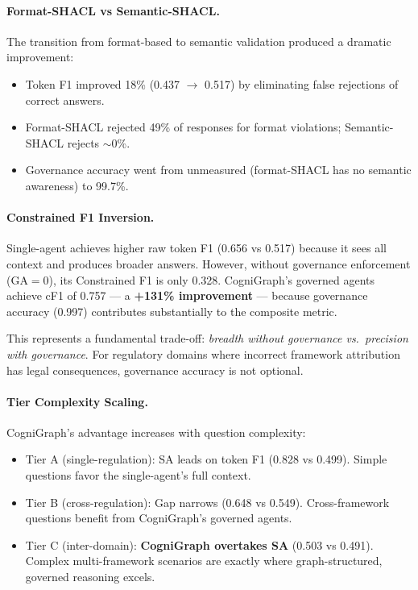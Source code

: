 \documentclass[a4paper,11pt]{article}
\theoremstyle{definition}
\begin{document}
\paragraph{Format-SHACL vs Semantic-SHACL.}
The transition from format-based to semantic validation produced a dramatic improvement:
\begin{itemize}
\item Token F1 improved 18\% (0.437 $\to$ 0.517) by eliminating false rejections of correct answers.
\item Format-SHACL rejected 49\% of responses for format violations; Semantic-SHACL rejects $\sim$0\%.
\item Governance accuracy went from unmeasured (format-SHACL has no semantic awareness) to 99.7\%.
\end{itemize}

\paragraph{Constrained F1 Inversion.}
Single-agent achieves higher raw token F1 (0.656 vs 0.517) because it sees all context and produces broader answers. However, without governance enforcement ($\mathrm{GA}=0$), its Constrained F1 is only 0.328. CogniGraph's governed agents achieve cF1 of 0.757 --- a \textbf{+131\% improvement} --- because governance accuracy (0.997) contributes substantially to the composite metric.

This represents a fundamental trade-off: \textit{breadth without governance vs.\ precision with governance}. For regulatory domains where incorrect framework attribution has legal consequences, governance accuracy is not optional.

\paragraph{Tier Complexity Scaling.}
CogniGraph's advantage increases with question complexity:
\begin{itemize}
\item Tier A (single-regulation): SA leads on token F1 (0.828 vs 0.499). Simple questions favor the single-agent's full context.
\item Tier B (cross-regulation): Gap narrows (0.648 vs 0.549). Cross-framework questions benefit from CogniGraph's governed agents.
\item Tier C (inter-domain): \textbf{CogniGraph overtakes SA} (0.503 vs 0.491). Complex multi-framework scenarios are exactly where graph-structured, governed reasoning excels.
\end{itemize}
\end{document}
